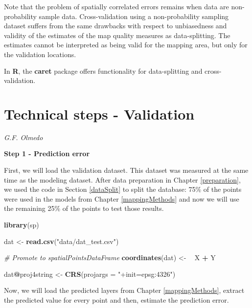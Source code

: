 \documentclass[10pt,b5paper,]{book}
\newenvironment{Shaded}{\begin{snugshade}}{\end{snugshade}}
\newcommand{\CommentTok}[1]{\textcolor[rgb]{0.56,0.35,0.01}{\textit{#1}}}
\newcommand{\DataTypeTok}[1]{\textcolor[rgb]{0.13,0.29,0.53}{#1}}
\newcommand{\ErrorTok}[1]{\textcolor[rgb]{0.64,0.00,0.00}{\textbf{#1}}}
\newcommand{\KeywordTok}[1]{\textcolor[rgb]{0.13,0.29,0.53}{\textbf{#1}}}
\newcommand{\NormalTok}[1]{#1}
\newcommand{\OperatorTok}[1]{\textcolor[rgb]{0.81,0.36,0.00}{\textbf{#1}}}
\newcommand{\StringTok}[1]{\textcolor[rgb]{0.31,0.60,0.02}{#1}}
\theoremstyle{definition}
\theoremstyle{definition}
\theoremstyle{definition}
\theoremstyle{remark}
\begin{document}
Note that the problem of spatially correlated errors remains when data
are non-probability sample data. Cross-validation using a
non-probability sampling dataset suffers from the same drawbacks with
respect to unbiasedness and validity of the estimates of the map quality
measures as data-splitting. The estimates cannot be interpreted as being
valid for the mapping area, but only for the validation locations.

In \textbf{R}, the \textbf{caret} package \citep{kuhn2016short} offers
functionality for data-splitting and cross-validation.

\hypertarget{TS:validation}{%
\section{Technical steps - Validation}\label{TS:validation}}

\emph{G.F. Olmedo}

\textbf{Step 1 - Prediction error}

First, we will load the validation dataset. This dataset was measured at
the same time as the modeling dataset. After data preparation in Chapter
\ref{preparation}, we used the code in Section \ref{dataSplit} to split
the database: 75\% of the points were used in the models from Chapter
\ref{mappingMethods} and now we will use the remaining 25\% of the
points to test those results.

\begin{Shaded}
\begin{Highlighting}[]
\KeywordTok{library}\NormalTok{(sp)}

\NormalTok{dat <-}\StringTok{ }\KeywordTok{read.csv}\NormalTok{(}\StringTok{"data/dat_test.csv"}\NormalTok{)}

\CommentTok{# Promote to spatialPointsDataFrame }
\KeywordTok{coordinates}\NormalTok{(dat) <-}\StringTok{ }\ErrorTok{~}\StringTok{ }\NormalTok{X }\OperatorTok{+}\StringTok{ }\NormalTok{Y}

\NormalTok{dat}\OperatorTok{@}\NormalTok{proj4string <-}\StringTok{ }\KeywordTok{CRS}\NormalTok{(}\DataTypeTok{projargs =} \StringTok{"+init=epsg:4326"}\NormalTok{)}
\end{Highlighting}
\end{Shaded}

Now, we will load the predicted layers from Chapter
\ref{mappingMethods}, extract the predicted value for every point and
then, estimate the prediction error.
\end{document}
